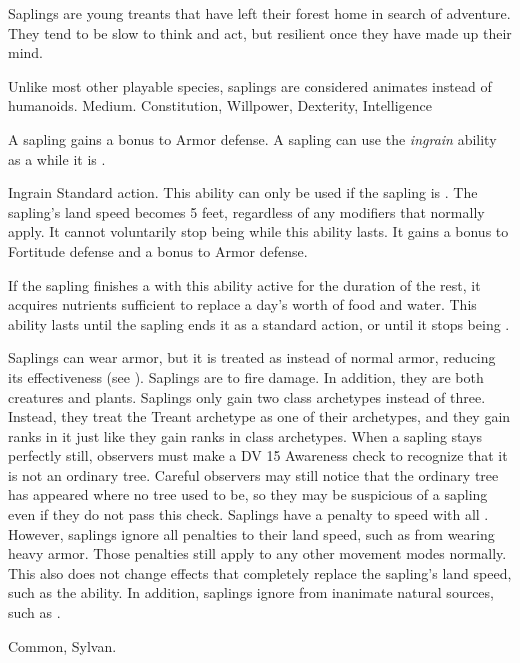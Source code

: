     Saplings are young treants that have left their forest home in search of adventure.
    They tend to be slow to think and act, but resilient once they have made up their mind.

     Unlike most other playable species, saplings are considered animates instead of humanoids.
     Medium.
      Constitution,  Willpower,  Dexterity,  Intelligence
    \begin{itemize}
         A sapling gains a  bonus to Armor defense.
         A sapling can use the \textit{ingrain} ability as a  while it is .
            \begin{activeability}{Ingrain}
                \abilityusagetime Standard action.
                \rankline
                This ability can only be used if the sapling is .
                The sapling's land speed becomes 5 feet, regardless of any modifiers that normally apply.
                It cannot voluntarily stop being  while this ability lasts.
                It gains a  bonus to Fortitude defense and a  bonus to Armor defense.

                If the sapling finishes a  with this ability active for the duration of the rest, it acquires nutrients sufficient to replace a day's worth of food and water.
                This ability lasts until the sapling ends it as a standard action, or until it stops being .
            \end{activeability}
         Saplings can wear armor, but it is treated as  instead of normal armor, reducing its effectiveness (see ).
         Saplings are \vulnerable to fire damage. In addition, they are both creatures and plants.
         Saplings only gain two class archetypes instead of three.
            Instead, they treat the Treant archetype as one of their archetypes, and they gain ranks in it just like they gain ranks in class archetypes.
         When a sapling stays perfectly still, observers must make a DV 15 Awareness check to recognize that it is not an ordinary tree.
        Careful observers may still notice that the ordinary tree has appeared where no tree used to be, so they may be suspicious of a sapling even if they do not pass this check.
         Saplings have a  penalty to speed with all .
            However, saplings ignore all penalties to their land speed, such as from wearing heavy armor.
            Those penalties still apply to any other movement modes normally.
            This also does not change effects that completely replace the sapling's land speed, such as the  ability.
            In addition, saplings ignore  from inanimate natural sources, such as .
    \end{itemize}
     Common, Sylvan.

